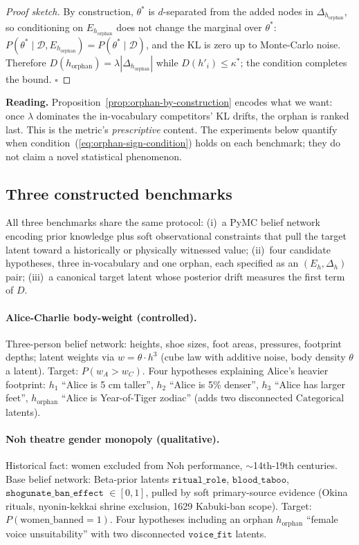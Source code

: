 \documentclass{article}
\begin{document}
\begin{proof}[Proof sketch]
By construction, $\theta^{*}$ is $d$-separated from the added nodes
in $\Delta_{h_{\mathrm{orphan}}}$, so conditioning on
$E_{h_{\mathrm{orphan}}}$ does not change the marginal over
$\theta^{*}$: $P(\theta^{*} \mid \mathcal{D},
E_{h_{\mathrm{orphan}}}) = P(\theta^{*} \mid \mathcal{D})$, and the
KL is zero up to Monte-Carlo noise. Therefore
$D(h_{\mathrm{orphan}}) = \lambda |\Delta_{h_{\mathrm{orphan}}}|$
while $D(h'_{i}) \leq \kappa^{*}$; the condition completes the
bound. $\square$
\end{proof}

\textbf{Reading.} Proposition~\ref{prop:orphan-by-construction}
encodes what we want: once $\lambda$ dominates the in-vocabulary
competitors' KL drifts, the orphan is ranked last. This is the
metric's \emph{prescriptive} content. The experiments below
quantify when condition~(\ref{eq:orphan-sign-condition}) holds on
each benchmark; they do not claim a novel statistical phenomenon.

\subsection{Three constructed benchmarks}
\label{sec:benchmarks}

All three benchmarks share the same protocol: (i)~a PyMC belief
network encoding prior knowledge plus soft observational constraints
that pull the target latent toward a historically or physically
witnessed value; (ii)~four candidate hypotheses, three in-vocabulary
and one orphan, each specified as an $(E_{h}, \Delta_{h})$ pair;
(iii)~a canonical target latent whose posterior drift measures the
first term of $D$.

\paragraph{Alice-Charlie body-weight (controlled).}
Three-person belief network: heights, shoe sizes, foot areas,
pressures, footprint depths; latent weights via
$w = \theta \cdot h^{3}$ (cube law with additive noise, body density
$\theta$ a latent). Target: $P(w_{A} > w_{C})$. Four hypotheses
explaining Alice's heavier footprint:
$h_{1}$ ``Alice is 5 cm taller'', $h_{2}$ ``Alice is 5\% denser'',
$h_{3}$ ``Alice has larger feet'',
$h_{\mathrm{orphan}}$ ``Alice is Year-of-Tiger zodiac''
(adds two disconnected $\mathrm{Categorical}$ latents).

\paragraph{Noh theatre gender monopoly (qualitative).}
Historical fact: women excluded from Noh performance, $\sim$14th-19th
centuries. Base belief network: Beta-prior latents
$\mathtt{ritual\_role}$, $\mathtt{blood\_taboo}$,
$\mathtt{shogunate\_ban\_effect}$ $\in [0, 1]$, pulled by soft
primary-source evidence (Okina rituals,
nyonin-kekkai shrine exclusion, 1629 Kabuki-ban scope). Target:
$P(\text{women\_banned} = 1)$. Four hypotheses including an orphan
$h_{\mathrm{orphan}}$ ``female voice unsuitability'' with two
disconnected $\mathtt{voice\_fit}$ latents.
\end{document}
